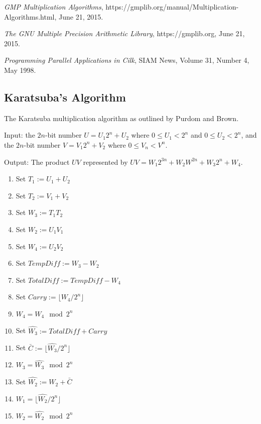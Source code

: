\documentclass[8pt, twocolumn]{article}
\begin{document}
\begin{thebibliography}{9}

\emph{GMP Multiplication Algorithms},
https://gmplib.org/manual/Multiplication-Algorithms.html,
June 21, 2015.

\emph{The GNU Multiple Precision Arithmetic Library},
https://gmplib.org,
June 21, 2015.

\emph{Programming Parallel Applications in Cilk},
SIAM News,
Volume 31, Number 4,
May 1998.

\end{thebibliography}
\clearpage
\onecolumn
\begin{appendix}
\section{Karatsuba's Algorithm}
The Karatsuba multiplication algorithm as outlined by Purdom and Brown.

Input: the $2n$-bit number $U = U_1 2^n + U_2$ where $0 \leq U_1 < 2^n$ and $0
\leq U_2 < 2^n$, and the $2n$-bit number $V=V_1 2^n + V_2$ where $0 \leq V_n
< V^n$.

Output: The product $UV$ represented by $UV = W_1 2^{3n} + W_2 W^{2n} + W_3 2^n + W_4$.

\begin{enumerate}
    \item Set $T_1       := U_1 + U_2$
    \item Set $T_2       := V_1 + V_2$
    \item Set $W_3       := T_1 T_2$
    \item Set $W_2       := U_1 V_1$
    \item Set $W_4       := U_2 V_2$
    \item Set $TempDiff  := W_3 - W_2$
    \item Set $TotalDiff := TempDiff - W_4$
    \item Set $Carry     := \lfloor W_4 / 2^n \rfloor$
    \item $W_4            = W_4 \mod 2^n$
    \item Set $\hat{W_3} := TotalDiff + Carry$
    \item Set $\bar{C}   := \lfloor \hat{W_3} / 2^n \rfloor$
    \item $W_3            = \hat{W_3} \mod 2^n$
    \item Set $\hat{W_2} := W_2 + \bar{C}$
    \item $W_1            = \lfloor \hat{W_2} / 2^n \rfloor$
    \item $W_2            = \hat{W_2} \mod 2^n$
\end{enumerate}
\end{appendix}
\end{document}
